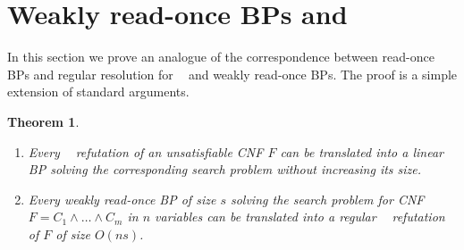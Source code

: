 \documentclass[10pt,a4paper]{article}
\newtheorem{theorem}{Theorem}
\theoremstyle{definition}
\theoremstyle{remark}
\DeclareMathOperator{\reslin}{\mathsf{Res}[\oplus]}
\newcommand{\wreadonce}{weakly read-once}
\newcommand{\Wreadonce}{Weakly read-once}
\begin{document}
\section{\texorpdfstring{\Wreadonce{} BPs and $\reslin$}{\Wreadonce{} BPs and Res[+]}}

In this section we prove an analogue of the correspondence between read-once BPs and regular resolution for $\reslin$ and \wreadonce{} BPs. The proof is a simple extension of standard arguments.

\begin{theorem}\label{thm:res-bp}\leavevmode
  \begin{enumerate}
      \item Every $\reslin$ refutation of an unsatisfiable CNF $F$ can be translated into a linear BP solving the corresponding search problem without increasing its size.

      \item Every \wreadonce{} BP of size $s$ solving the search problem for CNF $F = C_1 \wedge \ldots \wedge C_m$ in $n$ variables can be translated into a regular $\reslin$ refutation of $F$ of size $O(ns)$.
%
  \end{enumerate}
%
\end{theorem}
\end{document}
